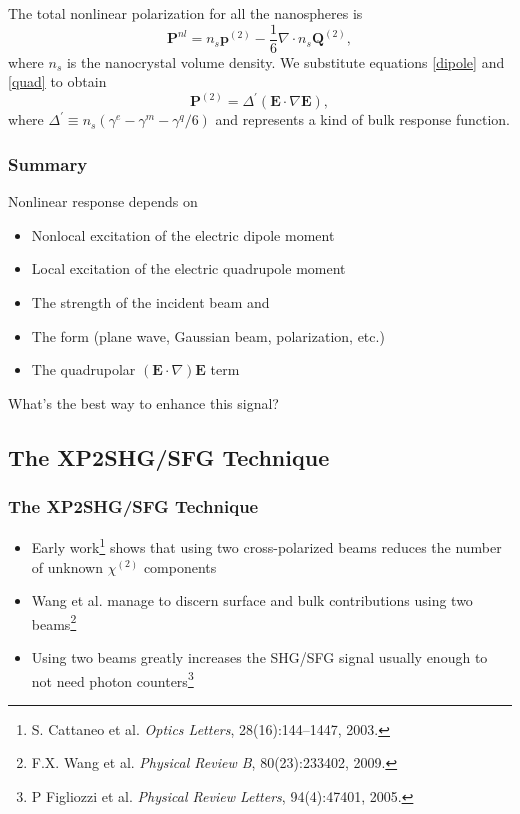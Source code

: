 \documentclass{beamer}
\begin{document}
\begin{frame}
The total nonlinear polarization for all the nanospheres is
\begin{equation}
\mathbf{P}^{nl} = n_{s}\mathbf{p}^{(2)} - \frac{1}{6}\nabla\cdot n_{s}\mathbf{Q}^{(2)},
\end{equation}
where $n_{s}$ is the nanocrystal volume density. We substitute equations \eqref{dipole} and \eqref{quad} to obtain
\begin{equation}
\mathbf{P}^{(2)} = \Delta^{\prime}\left(\mathbf{E}\cdot\nabla\mathbf{E}\right),\label{eq_mochan_p}
\end{equation}
where $\Delta^{'}\equiv n_{s}\left(\gamma^{e} - \gamma^{m} - \gamma^{q}/6\right)$ and represents a kind of bulk response function.
\end{frame}

\begin{frame}
\frametitle{Summary}
\begin{block}{Nonlinear response depends on}
\begin{itemize}
\item Nonlocal excitation of the electric dipole moment 
\item Local excitation of the electric quadrupole moment
\item The strength of the incident beam and
\item The form (plane wave, Gaussian beam, polarization, etc.)
\item The quadrupolar $\left(\mathbf{E}\cdot\nabla\right)\mathbf{E}$ term
\end{itemize}
\end{block}
What's the best way to enhance this signal?
\end{frame}

\subsection{The XP2SHG/SFG Technique}
\begin{frame}
\frametitle{The XP2SHG/SFG Technique}
\begin{itemize}
\item Early work\footnote{S. Cattaneo et al. \emph{Optics Letters}, 28(16):144--1447, 2003.} shows that using two cross-polarized beams reduces the number of unknown $\chi^{(2)}$ components
\item Wang et al. manage to discern surface and bulk contributions using two beams\footnote{F.X. Wang et al. \emph{Physical Review B}, 80(23):233402, 2009.}
\item Using two beams greatly increases the SHG/SFG signal usually enough to not need photon counters\footnote{P Figliozzi et al. \emph{Physical Review Letters}, 94(4):47401, 2005.}
\end{itemize}
\end{frame}
\end{document}
